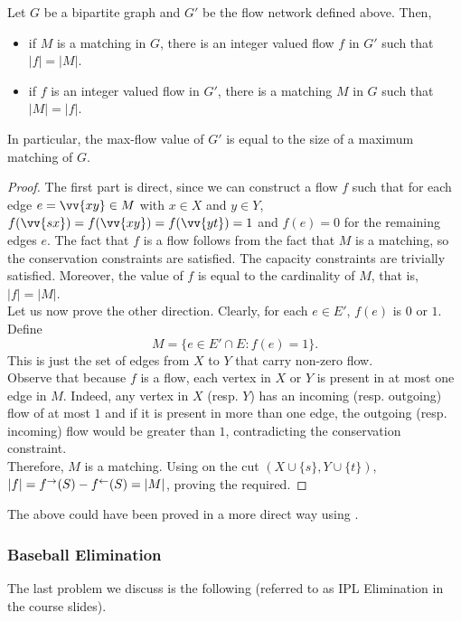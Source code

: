 \begin{lemma}
	Let $G$ be a bipartite graph and $G'$ be the flow network defined above. Then,
	\begin{itemize}
		\item if $M$ is a matching in $G$, there is an integer valued flow $f$ in $G'$ such that $|f|=|M|$.
		\item if $f$ is an integer valued flow in $G'$, there is a matching $M$ in $G$ such that $|M|=|f|$.
	\end{itemize}
	In particular, the max-flow value of $G'$ is equal to the size of a maximum matching of $G$.
\end{lemma}
\begin{proof}
	The first part is direct, since we can construct a flow $f$ such that for each edge $e = \vv{xy}\in M$ with $x\in X$ and $y\in Y$, $f(\vv{sx})=f(\vv{xy})=f(\vv{yt})=1$ and $f(e)=0$ for the remaining edges $e$. The fact that $f$ is a flow follows from the fact that $M$ is a matching, so the conservation constraints are satisfied. The capacity constraints are trivially satisfied. Moreover, the value of $f$ is equal to the cardinality of $M$, that is, $|f|=|M|$.\\

	Let us now prove the other direction. Clearly, for each $e\in E'$, $f(e)$ is $0$ or $1$. Define
	\[ M = \{e\in E'\cap E : f(e)=1\}. \]
	This is just the set of edges from $X$ to $Y$ that carry non-zero flow.\\
	Observe that because $f$ is a flow, each vertex in $X$ or $Y$ is present in at most one edge in $M$. Indeed, any vertex in $X$ (resp. $Y$) has an incoming (resp. outgoing) flow of at most $1$ and if it is present in more than one edge, the outgoing (resp. incoming) flow would be greater than $1$, contradicting the conservation constraint.\\
	Therefore, $M$ is a matching. Using  on the cut $(X\cup\{s\},Y\cup\{t\})$, $|f| = f^\to(S) - f^\leftarrow(S) = |M|$, proving the required.
\end{proof}

The above could have been proved in a more direct way using .

\subsubsection{Baseball Elimination}

The last problem we discuss is the following (referred to as IPL Elimination in the course slides).\\


